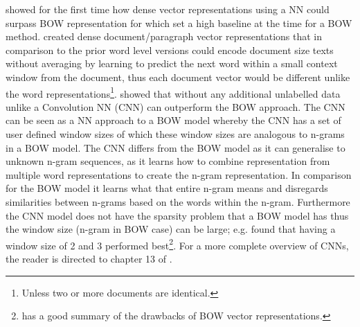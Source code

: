 \citet{le2014distributed} showed for the first time how dense vector representations using a NN could surpass BOW representation for which \citet{wang-manning-2012-baselines} set a high baseline at the time for a BOW method. \citet{le2014distributed} created dense document/paragraph vector representations that in comparison to the prior word level versions \citep{maas-etal-2011-learning} could encode document size texts without averaging by learning to predict the next word within a small context window from the document, thus each document vector would be different unlike the word representations\footnote{Unless two or more documents are identical.}. \citet{johnson-zhang-2015-effective} showed that without any additional unlabelled data unlike \citet{le2014distributed} a Convolution NN (CNN) can outperform the BOW approach. The CNN can be seen as a NN approach to a BOW model whereby the CNN has a set of user defined window sizes of which these window sizes are analogous to n-grams in a BOW model. The CNN differs from the BOW model as it can generalise to unknown n-gram sequences, as it learns how to combine representation from multiple word representations to create the n-gram representation. In comparison for the BOW model it learns what that entire n-gram means and disregards similarities between n-grams based on the words within the n-gram. Furthermore the CNN model does not have the sparsity problem that a BOW model has thus the window size (n-gram in BOW case) can be large; e.g. \citet{johnson-zhang-2015-effective} found that having a window size of 2 and 3 performed best\footnote{\citet{le2014distributed} has a good summary of the drawbacks of BOW vector representations.}. For a more complete overview of CNNs, the reader is directed to chapter 13 of \citet{goldberg2017neural}.

